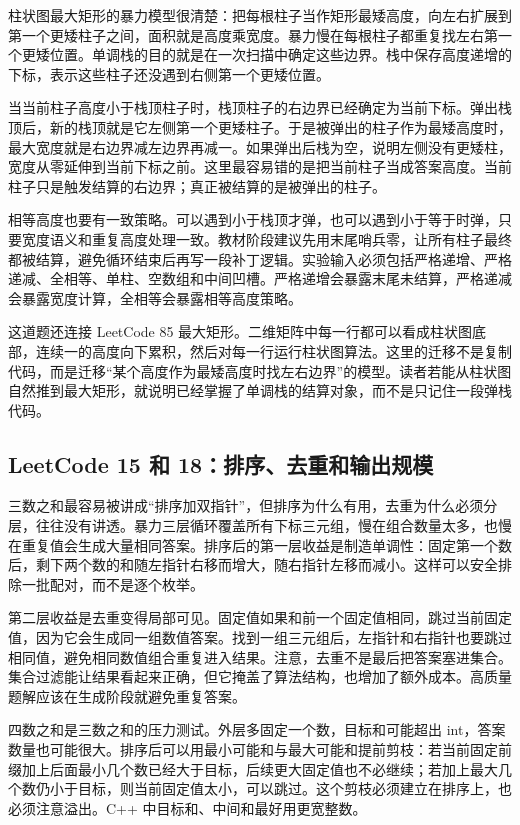 柱状图最大矩形的暴力模型很清楚：把每根柱子当作矩形最矮高度，向左右扩展到第一个更矮柱子之间，面积就是高度乘宽度。暴力慢在每根柱子都重复找左右第一个更矮位置。单调栈的目的就是在一次扫描中确定这些边界。栈中保存高度递增的下标，表示这些柱子还没遇到右侧第一个更矮位置。

当当前柱子高度小于栈顶柱子时，栈顶柱子的右边界已经确定为当前下标。弹出栈顶后，新的栈顶就是它左侧第一个更矮柱子。于是被弹出的柱子作为最矮高度时，最大宽度就是右边界减左边界再减一。如果弹出后栈为空，说明左侧没有更矮柱，宽度从零延伸到当前下标之前。这里最容易错的是把当前柱子当成答案高度。当前柱子只是触发结算的右边界；真正被结算的是被弹出的柱子。

相等高度也要有一致策略。可以遇到小于栈顶才弹，也可以遇到小于等于时弹，只要宽度语义和重复高度处理一致。教材阶段建议先用末尾哨兵零，让所有柱子最终都被结算，避免循环结束后再写一段补丁逻辑。实验输入必须包括严格递增、严格递减、全相等、单柱、空数组和中间凹槽。严格递增会暴露末尾未结算，严格递减会暴露宽度计算，全相等会暴露相等高度策略。

这道题还连接 LeetCode 85 最大矩形。二维矩阵中每一行都可以看成柱状图底部，连续一的高度向下累积，然后对每一行运行柱状图算法。这里的迁移不是复制代码，而是迁移“某个高度作为最矮高度时找左右边界”的模型。读者若能从柱状图自然推到最大矩形，就说明已经掌握了单调栈的结算对象，而不是只记住一段弹栈代码。

\subsection{LeetCode 15 和 18：排序、去重和输出规模}

三数之和最容易被讲成“排序加双指针”，但排序为什么有用，去重为什么必须分层，往往没有讲透。暴力三层循环覆盖所有下标三元组，慢在组合数量太多，也慢在重复值会生成大量相同答案。排序后的第一层收益是制造单调性：固定第一个数后，剩下两个数的和随左指针右移而增大，随右指针左移而减小。这样可以安全排除一批配对，而不是逐个枚举。

第二层收益是去重变得局部可见。固定值如果和前一个固定值相同，跳过当前固定值，因为它会生成同一组数值答案。找到一组三元组后，左指针和右指针也要跳过相同值，避免相同数值组合重复进入结果。注意，去重不是最后把答案塞进集合。集合过滤能让结果看起来正确，但它掩盖了算法结构，也增加了额外成本。高质量题解应该在生成阶段就避免重复答案。

四数之和是三数之和的压力测试。外层多固定一个数，目标和可能超出 int，答案数量也可能很大。排序后可以用最小可能和与最大可能和提前剪枝：若当前固定前缀加上后面最小几个数已经大于目标，后续更大固定值也不必继续；若加上最大几个数仍小于目标，则当前固定值太小，可以跳过。这个剪枝必须建立在排序上，也必须注意溢出。C++ 中目标和、中间和最好用更宽整数。

